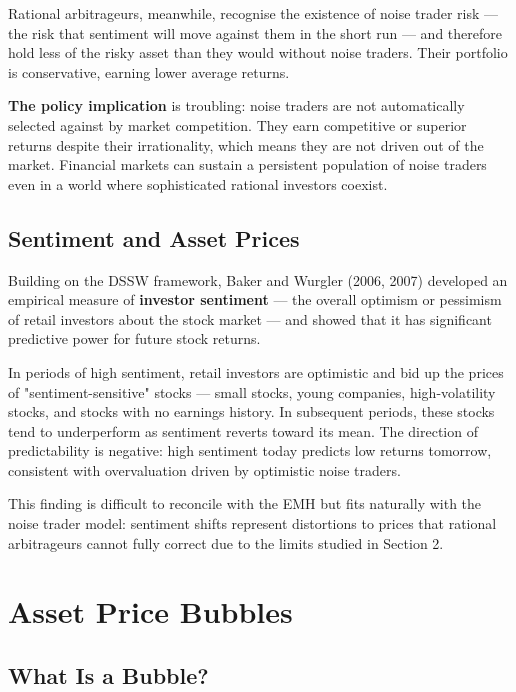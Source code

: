 \documentclass[12pt, letterpaper]{article}
\begin{document}
Rational arbitrageurs, meanwhile, recognise the existence of noise trader risk --- the risk that sentiment will move against them in the short run --- and therefore hold less of the risky asset than they would without noise traders. Their portfolio is conservative, earning lower average returns.

\textbf{The policy implication} is troubling: noise traders are not automatically selected against by market competition. They earn competitive or superior returns despite their irrationality, which means they are not driven out of the market. Financial markets can sustain a persistent population of noise traders even in a world where sophisticated rational investors coexist.


\subsection{Sentiment and Asset Prices}


Building on the DSSW framework, Baker and Wurgler (2006, 2007) developed an empirical measure of \textbf{investor sentiment} --- the overall optimism or pessimism of retail investors about the stock market --- and showed that it has significant predictive power for future stock returns.

In periods of high sentiment, retail investors are optimistic and bid up the prices of "sentiment-sensitive" stocks --- small stocks, young companies, high-volatility stocks, and stocks with no earnings history. In subsequent periods, these stocks tend to underperform as sentiment reverts toward its mean. The direction of predictability is negative: high sentiment today predicts low returns tomorrow, consistent with overvaluation driven by optimistic noise traders.

This finding is difficult to reconcile with the EMH but fits naturally with the noise trader model: sentiment shifts represent distortions to prices that rational arbitrageurs cannot fully correct due to the limits studied in Section 2.

\medskip


\section{Asset Price Bubbles}



\subsection{What Is a Bubble?}
\end{document}
